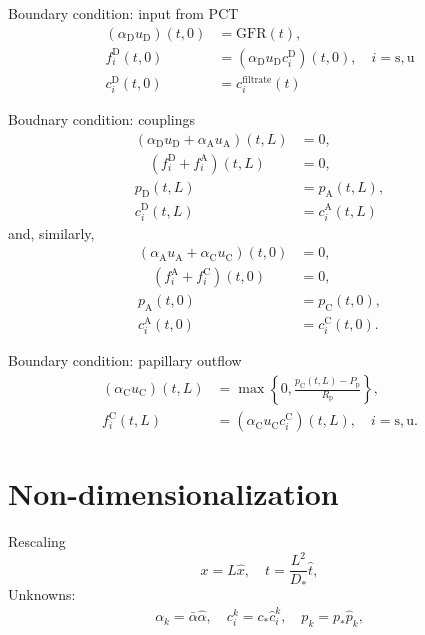 \documentclass{beamer}
\begin{document}
\begin{frame}{Boundary condition: input from PCT}
    \begin{align}
        (\alpha_\mathrm{D} u_\mathrm{D})(t,0) &= \mathrm{GFR}(t),\\
        f_i^\mathrm{D}(t,0) &= (\alpha_\mathrm{D}u_\mathrm{D}c_i^\mathrm{D})(t,0),\quad i=\mathrm{s,u}\\
        c_i^\mathrm{D}(t,0) &= c_{i}^{\mathrm{filtrate}}(t)
    \end{align}
\end{frame}

\begin{frame}{Boudnary condition: couplings}
    \begin{align}
        (\alpha_\mathrm{D}u_\mathrm{D}+\alpha_\mathrm{A}u_\mathrm{A})(t,L) &= 0,\\
        \quad\left( f_i^\mathrm{D}+f_i^\mathrm{A} \right)(t,L) &= 0,\\
        p_\mathrm{D}(t,L)&= p_{\mathrm{A}}(t,L),\\ 
        c_i^\mathrm{D}(t,L) &=c_i^\mathrm{A}(t,L)
    \end{align}
    and, similarly,
    \begin{align}
        (\alpha_\mathrm{A}u_\mathrm{A}+\alpha_\mathrm{C}u_\mathrm{C})(t,0) &= 0,\\
        \quad\left( f_i^\mathrm{A}+f_i^\mathrm{C} \right)(t,0) &= 0,\\
        p_\mathrm{A}(t,0)&= p_{\mathrm{C}}(t,0),\\ 
        c_i^\mathrm{A}(t,0) &=c_i^\mathrm{C}(t,0).
    \end{align}
\end{frame}

\begin{frame}{Boundary condition: papillary outflow}
    \begin{align}
        (\alpha_\mathrm{C} u_\mathrm{C} )(t,L) &= \max\left\{ 0,\frac{p_\mathrm{C} (t,L) - P_{\mathrm{p}} }{R_{\mathrm{p}}}\right\},\\
        f_i^\mathrm{C}(t,L) &= (\alpha_\mathrm{C}  u_\mathrm{C}  c_i^\mathrm{C})(t,L),\quad i=\mathrm{s},\mathrm{u}.
    \end{align}
\end{frame}

\section{Non-dimensionalization}
\begin{frame}{Rescaling}
    \begin{equation}
        x = L\hat{x},\quad t = \frac{L^2}{D_*}\hat{t},
    \end{equation}
    Unknowns:
    \begin{gather}
        \alpha_k = \bar{\alpha}\hat{\alpha},\quad c_i^k = c_*\hat{c}_i^k,\quad p_k = p_*\hat{p}_k,
    \end{gather}    
\end{frame}
\end{document}
